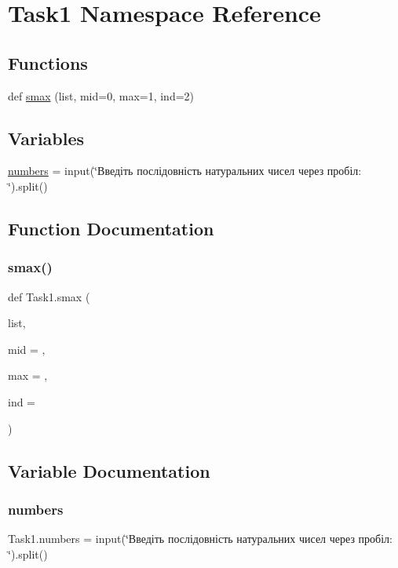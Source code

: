 \hypertarget{namespace_task1}{}\section{Task1 Namespace Reference}
\label{namespace_task1}
\subsection*{Functions}
\begin{DoxyCompactItemize}
\item 
def \hyperlink{namespace_task1_a517c30c464db1e52a593515439139338}{smax} (list, mid=0, max=1, ind=2)
\end{DoxyCompactItemize}
\subsection*{Variables}
\begin{DoxyCompactItemize}
\item 
\hyperlink{namespace_task1_a8688e924bd52aeda371ffca58506db7f}{numbers} = input(\char`\"{}Введіть послідовність натуральних чисел через пробіл\+: \char`\"{}).split()
\end{DoxyCompactItemize}


\subsection{Function Documentation}
\mbox{\label{namespace_task1_a517c30c464db1e52a593515439139338}} 
\subsubsection{\texorpdfstring{smax()}{smax()}}
{\footnotesize\ttfamily def Task1.\+smax (\begin{DoxyParamCaption}\item[{}]{list,  }\item[{}]{mid = {},  }\item[{}]{max = {},  }\item[{}]{ind = {} }\end{DoxyParamCaption})}



\subsection{Variable Documentation}
\mbox{\label{namespace_task1_a8688e924bd52aeda371ffca58506db7f}} 
\subsubsection{\texorpdfstring{numbers}{numbers}}
{\footnotesize\ttfamily Task1.\+numbers = input(\char`\"{}Введіть послідовність натуральних чисел через пробіл\+: \char`\"{}).split()}

